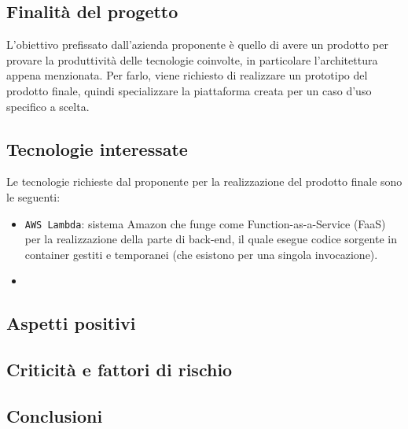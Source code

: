 \subsection{Finalità del progetto}
L'obiettivo prefissato dall'azienda proponente è quello di avere un prodotto per provare la produttività delle tecnologie coinvolte, in particolare l'architettura appena menzionata. Per farlo, viene richiesto di realizzare un prototipo del prodotto finale, quindi specializzare la piattaforma creata per un caso d'uso specifico a scelta.

\subsection{Tecnologie interessate}
Le tecnologie richieste dal proponente per la realizzazione del prodotto finale sono le seguenti:
\begin{itemize}
	\item \verb|AWS Lambda|: sistema Amazon che funge come Function-as-a-Service (FaaS) per la realizzazione della parte di back-end, il quale esegue codice sorgente in container gestiti e temporanei (che esistono per una singola invocazione).
	\item 
\end{itemize}

\subsection{Aspetti positivi}

\subsection{Criticità e fattori di rischio}

\subsection{Conclusioni}